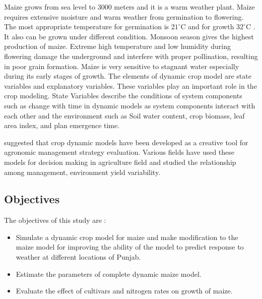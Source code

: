  Maize grows from sea level to 3000 meters and it is a warm weather plant. Maize requires extensive moisture and warm weather from germination to flowering. The most appropriate temperature for germination is $21^{\circ}\text{C}$ and for growth $32^{\circ}\text{C}$ . It also can be grown under different condition. Monsoon season gives the highest production of maize. Extreme high temperature and low humidity during flowering damage the underground and interfere with proper pollination, resulting in poor grain formation. Maize is very sensitive to stagnant water especially during its early stages of growth. The elements of dynamic crop model are state variables and explanatory variables. These variables play an important role in the crop modeling. State Variables describe the conditions of system components such as change with time in dynamic models as system components interact with each other and the environment such as Soil water content, crop biomass, leaf area index, and plan emergence time. 
 
 \citet{Sinclair1996}  suggested that crop dynamic models have been developed as a creative tool for agronomic management strategy evaluation. Various fields have used these models for decision making in agriculture field and studied the relationship among management, environment yield variability. 
\subsection{Objectives}
 The objectives of this study are : 
\begin{itemize}
	
\item Simulate a dynamic crop model for maize and make modification to the maize model for improving the ability of the model to predict response to weather at different locations of Punjab.  
\item	Estimate the parameters of complete dynamic maize model. 
\item  Evaluate the effect of cultivars and nitrogen rates on growth of maize. 
  \end{itemize}